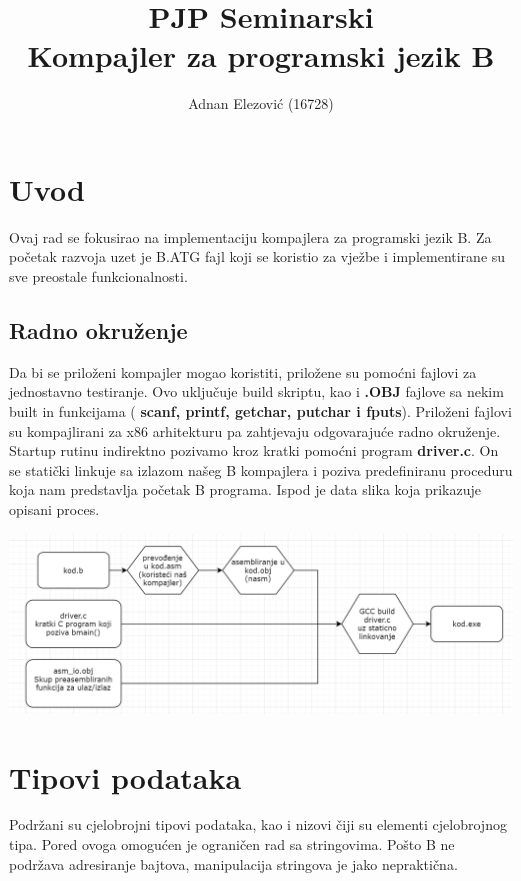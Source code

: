 \documentclass[]{report}
\title{PJP Seminarski\\Kompajler za programski jezik B}
\author{Adnan Elezović (16728)}
\begin{document}
	
	\maketitle
	
	\renewcommand{\contentsname}{Sadržaj}
	
	\chapter{Uvod}
	Ovaj rad se fokusirao na implementaciju kompajlera za programski jezik B. Za početak razvoja uzet je B.ATG fajl koji se koristio za vježbe i implementirane su sve preostale funkcionalnosti.
	
	\section{Radno okruženje}
	Da bi se priloženi kompajler mogao koristiti, priložene su pomoćni fajlovi za jednostavno testiranje. 
	Ovo uključuje build skriptu, kao i \textbf{.OBJ} fajlove sa nekim built in funkcijama ( \textbf{scanf, printf, getchar, putchar i fputs}). 
	Priloženi fajlovi su kompajlirani za x86 arhitekturu pa zahtjevaju odgovarajuće radno okruženje.
	Startup rutinu indirektno pozivamo kroz kratki pomoćni program \textbf{driver.c}. On se statički linkuje sa izlazom našeg B kompajlera i poziva predefiniranu proceduru koja nam predstavlja početak B programa. Ispod je data slika koja prikazuje opisani proces.
	\begin{center}
		\includegraphics[scale=0.5]{diag1.png}
	\end{center}
	
	\chapter{Tipovi podataka}
	Podržani su cjelobrojni tipovi podataka, kao i nizovi čiji su elementi cjelobrojnog tipa. Pored ovoga omogućen je ograničen rad sa stringovima. Pošto B ne podržava adresiranje bajtova, manipulacija stringova je jako nepraktična.
\end{document}
